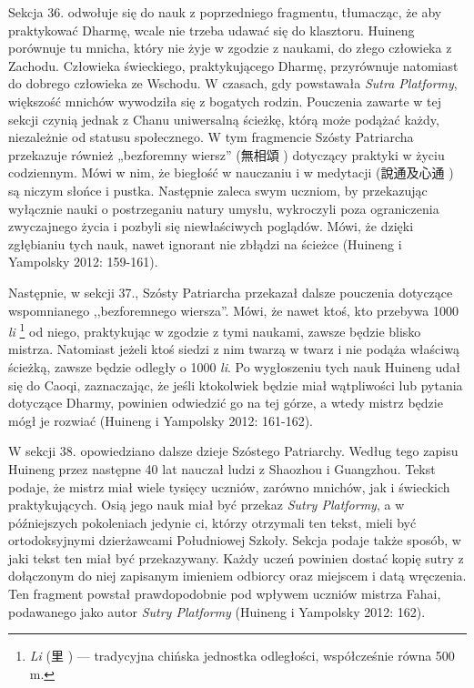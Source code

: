 Sekcja 36. odwołuje się do nauk z poprzedniego fragmentu, tłumacząc, że aby praktykować Dharmę, wcale nie trzeba udawać się do klasztoru.
Huineng porównuje tu mnicha, który nie żyje w zgodzie z naukami, do złego człowieka z Zachodu.
Człowieka świeckiego, praktykującego Dharmę, przyrównuje natomiast do dobrego człowieka ze Wschodu.
W czasach, gdy powstawała \textit{Sutra Platformy}, większość mnichów wywodziła się z bogatych rodzin.
Pouczenia zawarte w tej sekcji czynią jednak z Chanu uniwersalną ścieżkę, którą może podążać każdy, niezależnie od statusu społecznego.
W tym fragmencie Szósty Patriarcha przekazuje również „bezforemny wiersz” (無相頌 ) dotyczący praktyki w życiu codziennym.
Mówi w nim, że biegłość w nauczaniu i w medytacji (說通及心通 ) są niczym słońce i pustka.
Następnie zaleca swym uczniom, by przekazując wyłącznie nauki o postrzeganiu natury umysłu, wykroczyli poza ograniczenia zwyczajnego życia i pozbyli się niewłaściwych poglądów. %
Mówi, że dzięki zgłębianiu tych nauk, nawet ignorant nie zbłądzi na ścieżce %
(Huineng i Yampolsky 2012: 159-161).

Następnie, w sekcji 37., Szósty Patriarcha przekazał dalsze pouczenia dotyczące wspomnianego ,,bezforemnego wiersza''.
Mówi, że nawet ktoś, kto przebywa  1000 \textit{li}%
\footnote{\textit{Li} (里 ) --- tradycyjna chińska jednostka odległości, współcześnie równa 500 m.} od niego, praktykując w zgodzie z tymi naukami, zawsze będzie blisko mistrza.
Natomiast jeżeli ktoś siedzi z nim twarzą w twarz i nie podąża właściwą ścieżką, zawsze będzie odległy o 1000 \textit{li}.
Po wygłoszeniu tych nauk Huineng udał się do Caoqi, zaznaczając, że jeśli ktokolwiek będzie miał wątpliwości lub pytania dotyczące Dharmy, powinien odwiedzić go na tej górze, a wtedy mistrz będzie mógł je rozwiać %
(Huineng i Yampolsky 2012: 161-162).

W sekcji 38. opowiedziano dalsze dzieje Szóstego Patriarchy.
Według tego zapisu Huineng przez następne 40 lat nauczał ludzi z Shaozhou i Guangzhou.
Tekst podaje, że mistrz miał wiele tysięcy uczniów, zarówno mnichów, jak i świeckich praktykujących.
Osią jego nauk miał być przekaz \textit{Sutry Platformy}, a w późniejszych pokoleniach jedynie ci, którzy otrzymali ten tekst, mieli być ortodoksyjnymi dzierżawcami Południowej Szkoły.
Sekcja podaje także sposób, w jaki tekst ten miał być przekazywany.
Każdy uczeń powinien dostać kopię sutry z dołączonym do niej zapisanym imieniem odbiorcy oraz miejscem i datą wręczenia.
Ten fragment powstał prawdopodobnie pod wpływem uczniów mistrza Fahai, podawanego jako autor \textit{Sutry Platformy} %
(Huineng i Yampolsky 2012: 162).

